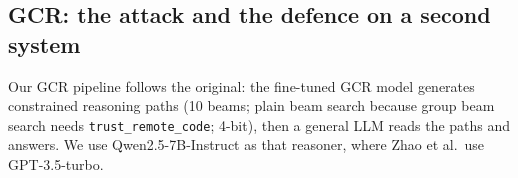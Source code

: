 \documentclass[preprint,12pt]{elsarticle}
\begin{document}
\subsection{GCR: the attack and the defence on a second system}\label{sec:gcr}
Our GCR pipeline follows the original: the fine-tuned GCR model generates constrained reasoning paths (10 beams; plain beam search because group beam search needs \texttt{trust\_remote\_code}; 4-bit), then a general LLM reads the paths and answers. We use Qwen2.5-7B-Instruct as that reasoner, where Zhao et al.\ use GPT-3.5-turbo.
\begin{table}[tbp]
\centering\small
{}
\caption{GCR with a second-stage reasoner, clean versus attacked graph (pilot on the first 400 WebQSP test questions, 4-bit, paper attack).}
\end{table}
\end{document}
